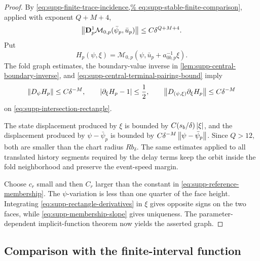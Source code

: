 \begin{proof}
By \cref{eq:supp-finite-trace-incidence,%
eq:supp-stable-finite-comparison}, applied with exponent \(Q+M+4\),
\begin{equation}
 \left\lVert\mathbf D_p^1
   \mathcal M_{0,p}(\bar\psi_p,\bar u_p)\right\rVert
 \le C\delta^{Q+M+4}.
 \label{eq:supp-reference-membership}
\end{equation}
Put
\[
 H_p(\psi,\xi)=
 \mathcal M_{0,p}
   (\psi,\bar u_p+a_{0b,p}^{-1}\xi).
\]
The fold graph estimates, the boundary-value inverse in
\cref{lem:supp-central-boundary-inverse}, and
\cref{eq:supp-central-terminal-pairing-bound} imply
\begin{equation}
 \left\lVert D_\psi H_p\right\rVert\le C\delta^{-M},
 \qquad
 \left\lvert\partial_\xi H_p-1\right\rvert\le\frac12,
 \qquad
 \left\lVert D_{(\psi,\xi)}\partial_\xi H_p\right\rVert
 \le C\delta^{-M}
 \label{eq:supp-rectangle-derivatives}
\end{equation}
on \cref{eq:supp-intersection-rectangle}.

The state displacement produced by \(\xi\) is bounded by
\(C(s_b/\delta)\left\lvert\xi\right\rvert\), and the displacement produced by
\(\psi-\bar\psi_p\) is bounded by
\(C\delta^{-M}\left\lVert\psi-\bar\psi_p\right\rVert\).  Since \(Q>12\), both are
smaller than the chart radius
\(Rb_\delta\).  The same estimates applied to all translated history
segments required by the delay terms keep the orbit inside the fold
neighborhood and preserve the event-speed margin.

Choose \(c_r\) small and then \(C_r\) larger than the constant in
\cref{eq:supp-reference-membership}.  The \(\psi\)-variation is less than
one quarter of the face height.  Integrating
\cref{eq:supp-rectangle-derivatives} in \(\xi\) gives opposite signs on
the two faces, while \cref{eq:supp-membership-slope} gives uniqueness.
The parameter-dependent implicit-function theorem now yields the asserted
graph.
\end{proof}

\subsection{Comparison with the finite-interval function}


